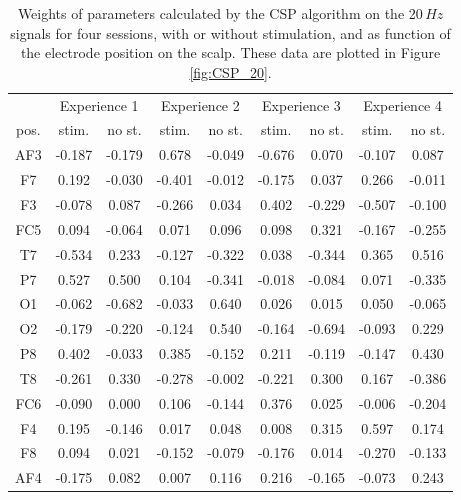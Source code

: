 \documentclass[smallextended]{svjour3}
\begin{document}
\begin{table}[]
\centering
\label{my-label}
\begin{tabular}{c|c|c|c|c|c|c|c|c|}
&\multicolumn{2}{c|}{Experience 1}&\multicolumn{2}{c|}{Experience 2}&\multicolumn{2}{c|}{Experience 3}&\multicolumn{2}{c|}{Experience 4}\\
pos.&stim.&no st.&stim.&no st.&stim.&no st.&stim.&no st.\\
\hline
AF3&-0.187&-0.179&0.678&-0.049&-0.676&0.070&-0.107&0.087\\
F7&0.192&-0.030&-0.401&-0.012&-0.175&0.037&0.266&-0.011\\
F3&-0.078&0.087&-0.266&0.034&0.402&-0.229&-0.507&-0.100\\
FC5&0.094&-0.064&0.071&0.096&0.098&0.321&-0.167&-0.255\\
T7&-0.534&0.233&-0.127&-0.322&0.038&-0.344&0.365&0.516\\
P7&0.527&0.500&0.104&-0.341&-0.018&-0.084&0.071&-0.335\\
O1&-0.062&-0.682&-0.033&0.640&0.026&0.015&0.050&-0.065\\
\hline
O2&-0.179&-0.220&-0.124&0.540&-0.164&-0.694&-0.093&0.229\\
P8&0.402&-0.033&0.385&-0.152&0.211&-0.119&-0.147&0.430\\
T8&-0.261&0.330&-0.278&-0.002&-0.221&0.300&0.167&-0.386\\
FC6&-0.090&0.000&0.106&-0.144&0.376&0.025&-0.006&-0.204\\
F4&0.195&-0.146&0.017&0.048&0.008&0.315&0.597&0.174\\
F8&0.094&0.021&-0.152&-0.079&-0.176&0.014&-0.270&-0.133\\
AF4&-0.175&0.082&0.007&0.116&0.216&-0.165&-0.073&0.243\\ 
\hline
\end{tabular}\label{table:CSP_20}
\caption{Weights of parameters calculated by the CSP algorithm on the 20\,$Hz$ signals for four sessions, with or without stimulation, and as function of the electrode position on the scalp. These data are plotted in Figure \ref{fig:CSP_20}.}
\end{table} 
\end{document}
